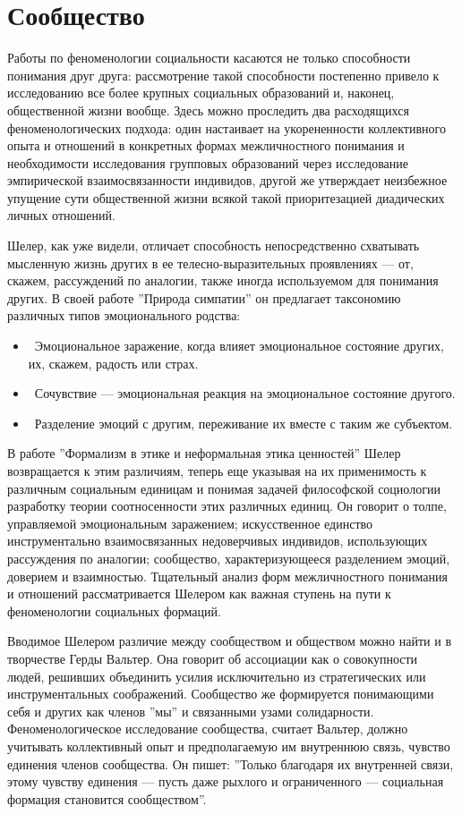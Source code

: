 \documentclass[11pt]{book}
\begin{document}
\section{Сообщество}

Работы по феноменологии социальности касаются не только способности понимания друг друга: рассмотрение такой способности постепенно привело к исследованию все более крупных социальных образований и, наконец, общественной жизни вообще. Здесь можно проследить два расходящихся феноменологических подхода: один настаивает на укорененности коллективного опыта и отношений в конкретных формах межличностного понимания и необходимости исследования групповых образований через исследование эмпирической взаимосвязанности индивидов, другой же утверждает неизбежное упущение сути общественной жизни всякой такой приоритезацией диадических личных отношений.

Шелер, как уже видели, отличает способность непосредственно схватывать мысленную жизнь других в ее телесно-выразительных проявлениях --- от, скажем, рассуждений по аналогии, также иногда используемом для понимания других. В своей работе ''Природа симпатии'' он предлагает таксономию различных типов эмоционального родства:

\begin{itemize}
  \item\ Эмоциональное заражение, когда влияет эмоциональное состояние других, их, скажем, радость или страх.
  \item\ Сочувствие --- эмоциональная реакция на эмоциональное состояние другого.
  \item\ Разделение эмоций с другим, переживание их вместе с таким же субъектом.
\end{itemize}

В работе ''Формализм в этике и неформальная этика ценностей'' Шелер возвращается к этим различиям, теперь еще указывая на их применимость к различным социальным единицам и понимая задачей философской социологии разработку теории соотносенности этих различных единиц. Он говорит о толпе, управляемой эмоциональным заражением; искусственное единство инструментально взаимосвязанных недоверчивых индивидов, использующих рассуждения по аналогии; сообщество, характеризующееся разделением эмоций, доверием и взаимностью. Тщательный анализ форм межличностного понимания и отношений рассматривается Шелером как важная ступень на пути к феноменологии социальных формаций.

Вводимое Шелером различие между сообществом и обществом можно найти и в творчестве Герды Вальтер. Она говорит об ассоциации как о совокупности людей, решивших объединить усилия исключительно из стратегических или инструментальных соображений. Сообщество же формируется понимающими себя и других как членов ''мы'' и связанными узами солидарности. Феноменологическое исследование сообщества, считает Вальтер, должно учитывать коллективный опыт и предполагаемую им внутреннюю связь, чувство единения членов сообщества. Он пишет: ''Только благодаря их внутренней связи, этому чувству единения --- пусть даже рыхлого и ограниченного --- социальная формация становится сообществом''.
\end{document}
